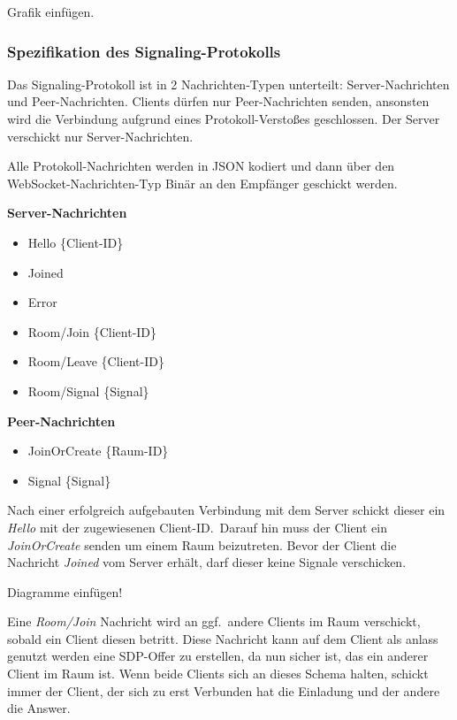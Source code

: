 \documentclass[journal]{IEEEtran}
\begin{document}
\begin{twocolumn}
Grafik einfügen.

\subsubsection{Spezifikation des Signaling-Protokolls}

Das Signaling-Protokoll ist in 2 Nachrichten-Typen unterteilt:
Server-Nachrichten und Peer-Nachrichten. Clients dürfen nur Peer-Nachrichten
senden, ansonsten wird die Verbindung aufgrund eines Protokoll-Verstoßes
geschlossen. Der Server verschickt nur Server-Nachrichten.

Alle Protokoll-Nachrichten werden in JSON kodiert und dann über den
WebSocket-Nachrichten-Typ Binär an den Empfänger geschickt werden.

\vspace{0.5em}

\textbf{Server-Nachrichten}

\begin{itemize}
	\item Hello \{Client-ID\}
	\item Joined
	\item Error
	\item Room/Join \{Client-ID\}
	\item Room/Leave \{Client-ID\}
	\item Room/Signal \{Signal\}
\end{itemize}

\vspace{0.5em}

\textbf{Peer-Nachrichten}

\begin{itemize}
	\item JoinOrCreate \{Raum-ID\}
	\item Signal \{Signal\}
\end{itemize}

\vspace{0.5em}

Nach einer erfolgreich aufgebauten Verbindung mit dem Server schickt dieser ein
\textit{Hello} mit der zugewiesenen Client-ID.\ Darauf hin muss der Client ein
\textit{JoinOrCreate} senden um einem Raum beizutreten. Bevor der Client die
Nachricht \textit{Joined} vom Server erhält, darf dieser keine Signale
verschicken.

Diagramme einfügen!

Eine \textit{Room/Join} Nachricht wird an ggf.\ andere Clients im Raum
verschickt, sobald ein Client diesen betritt. Diese Nachricht kann auf dem
Client als anlass genutzt werden eine SDP-Offer zu erstellen, da nun sicher
ist, das ein anderer Client im Raum ist. Wenn beide Clients sich an dieses
Schema halten, schickt immer der Client, der sich zu erst Verbunden hat die
Einladung und der andere die Answer.


\end{twocolumn}
\end{document}
